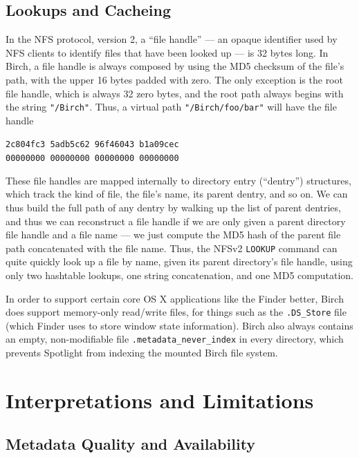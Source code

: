 \documentclass{article}
\begin{document}
\subsection{Lookups and Cacheing}

In the NFS protocol, version 2, a ``file handle'' --- an opaque
identifier used by NFS clients to identify files that have been looked
up --- is 32 bytes long. In Birch, a file handle is always composed by
using the MD5 \cite{RFC1321} checksum of the file's path, with the
upper 16 bytes padded with zero. The only exception is the root file
handle, which is always 32 zero bytes, and the root path always begins
with the string \texttt{"/Birch"}. Thus, a virtual path
\texttt{"/Birch/foo/bar"} will have the file handle

\begin{center}
  \texttt{2c804fc3 5adb5c62 96f46043 b1a09cec} \\
  \texttt{00000000 00000000 00000000 00000000}
\end{center}

\noindent These file handles are mapped internally to directory entry
(``dentry'') structures, which track the kind of file, the file's
name, its parent dentry, and so on. We can thus build the full path of
any dentry by walking up the list of parent dentries, and thus we can
reconstruct a file handle if we are only given a parent directory file
handle and a file name --- we just compute the MD5 hash of the parent
file path concatenated with the file name. Thus, the NFSv2
\texttt{LOOKUP} command can quite quickly look up a file by name,
given its parent directory's file handle, using only two hashtable
lookups, one string concatenation, and one MD5 computation.

In order to support certain core OS X applications like the Finder
better, Birch does support memory-only read/write files, for things
such as the \texttt{.DS\_Store} file (which Finder uses to store
window state information). Birch also always contains an empty,
non-modifiable file \texttt{.metadata\_never\_index} in every
directory, which prevents Spotlight from indexing the mounted Birch
file system.

\section{Interpretations and Limitations}

\subsection{Metadata Quality and Availability}
\end{document}

